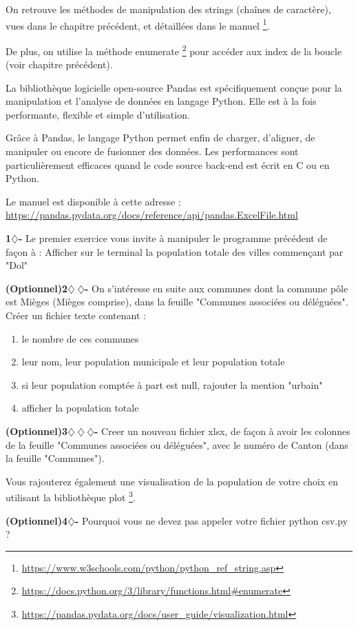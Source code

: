 On retrouve les méthodes de manipulation des strings (chaînes de caractère), vues dans le chapitre précédent, et détaillées dans le manuel
\footnote{\url{https://www.w3schools.com/python/python_ref_string.asp}}.

De plus, on utilise la méthode enumerate \footnote{\url{https://docs.python.org/3/library/functions.html\#enumerate}} pour accéder aux index de la boucle (voir chapitre précédent). 

\begin{tcolorbox}[lefttitle=2cm, colframe=gray!75!blue, title= \textbf{Tip for Code 2 : "\textit{Panel Data}"}]


La bibliothèque logicielle open-source Pandas est spécifiquement conçue pour la manipulation et l’analyse de données en langage Python. Elle est à la fois performante, flexible et simple d’utilisation.

Grâce à Pandas, le langage Python permet enfin de charger, d’aligner, de manipuler ou encore de fusionner des données. Les performances sont particulièrement efficaces quand le code source back-end est écrit en C ou en Python.

Le manuel est disponible à cette adresse :
\url{https://pandas.pydata.org/docs/reference/api/pandas.ExcelFile.html}

\end{tcolorbox}




\begin{tcolorbox}[lefttitle=2cm, colframe=gray!75!black, title= \textbf{Exercices}]
\textbf{1$\diamondsuit$-}
Le premier exercice vous invite à manipuler le programme précédent de façon à :
Afficher sur le terminal la population totale des villes commençant par "Dol"

    
\textbf{(Optionnel)2$\diamondsuit~\diamondsuit$-} 
On s'intéresse en suite aux communes dont la commune pôle est Mièges (Mièges comprise), dans la feuille "Communes associées ou déléguées".
Créer un fichier texte contenant :
\begin{enumerate}
    \item le nombre de ces communes
    \item leur nom, leur population municipale et leur population totale
    \item si leur population comptée à part est null, rajouter la mention "urbain"
    \item afficher la population totale
\end{enumerate}

    
\textbf{(Optionnel)3$\diamondsuit~\diamondsuit~\diamondsuit$-} 
Creer un nouveau fichier xlsx, de façon à avoir les colonnes de la feuille "Communes associées ou déléguées", avec le numéro de Canton (dans la feuille "Communes").

Vous rajouterez également une visualisation de la population de votre choix en utilisant la bibliothèque plot \footnote{\url{https://pandas.pydata.org/docs/user_guide/visualization.html}}.


\textbf{(Optionnel)4$\diamondsuit$-} Pourquoi vous ne devez pas appeler votre fichier python csv.py ?
\end{tcolorbox}


